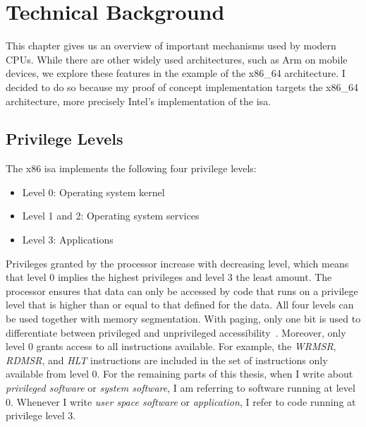 \section{Technical Background}
\label{sec:state:technical}
This chapter gives us an overview of important mechanisms used by modern CPUs.
While there are other widely used architectures, such as Arm on mobile devices,
we explore these features in the example of the x86\_64 architecture. I decided
to do so because my proof of concept implementation targets the x86\_64
architecture, more precisely Intel's implementation of the \gls{isa}.

\subsection{Privilege Levels}
\label{sec:state:technical:priv}
The x86 \gls{isa} implements the following four privilege levels:
\begin{itemize}
  \item Level 0: Operating system kernel
  \item Level 1 and 2: Operating system services
  \item Level 3: Applications
\end{itemize}
Privileges granted by the processor increase with decreasing level, which means
that level 0 implies the highest privileges and level 3 the least amount. The
processor ensures that data can only be accessed by code that runs on a
privilege level that is higher than or equal to that defined for the data. All
four levels can be used together with memory segmentation. With paging, only one
bit is used to differentiate between privileged and unprivileged
accessibility~\cite{intel_sdm}. Moreover, only level 0 grants access to all
instructions available. For example, the \textit{WRMSR}, \textit{RDMSR}, and
\textit{HLT} instructions are included in the set of instructions only available
from level 0. For the remaining parts of this thesis, when I write about
\textit{privileged software} or \textit{system software}, I am referring to
software running at level 0. Whenever I write \textit{user space software} or
\textit{application}, I refer to code running at privilege level 3.

